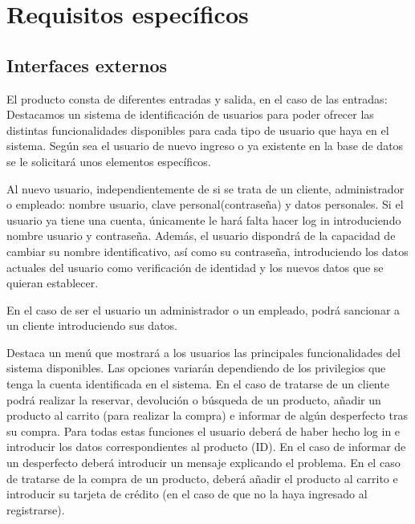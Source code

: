 \section{Requisitos específicos}
\label{sec:req_esp}
\subsection{Interfaces externos}

El producto consta de diferentes entradas y salida, en el caso de las entradas:\\
Destacamos un sistema de identificación de usuarios para poder ofrecer las distintas funcionalidades disponibles para cada tipo de usuario que haya en el sistema. Según sea el usuario de nuevo ingreso o ya existente en la base de datos se le solicitará unos elementos específicos.\vspace{5mm}

Al nuevo usuario, independientemente de si se trata de un cliente, administrador o empleado: nombre usuario, clave personal(contraseña) y datos personales. Si el usuario ya tiene una cuenta, únicamente le hará falta hacer log in introduciendo nombre usuario y contraseña. Además, el usuario dispondrá de la capacidad de cambiar su nombre identificativo, así como su contraseña, introduciendo los datos actuales del usuario como verificación de identidad y los nuevos datos que se quieran establecer.\vspace{5mm}

En el caso de ser el usuario un administrador o un empleado, podrá sancionar a un cliente introduciendo sus datos.\vspace{5mm}

Destaca un menú que mostrará a los usuarios las principales funcionalidades del sistema disponibles. Las opciones variarán dependiendo de los privilegios que tenga la cuenta identificada en el sistema. En el caso de tratarse de un cliente podrá realizar la reservar, devolución o búsqueda de un producto, añadir un producto al carrito (para realizar la compra) e informar de algún desperfecto tras su compra.\vspace{5mm}
Para todas estas funciones el usuario deberá de haber hecho log in e introducir los datos correspondientes al producto (ID). En el caso de informar de un desperfecto deberá introducir un mensaje explicando el problema. En el caso de tratarse de la compra de un producto, deberá añadir el producto al carrito e introducir su tarjeta de crédito (en el caso de que no la haya ingresado al registrarse).\vspace{5mm}

